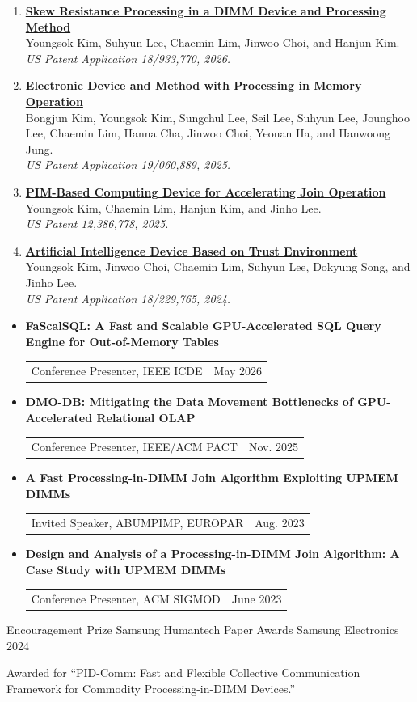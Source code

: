 \documentclass[10pt, a4paper]{awesome-cv}
\makeatletter
\newcommand{\patententry}[4]{%
  \item \textbf{\href{#1}{#2}}\\
  #3\\
  \textit{#4}
}
\newcommand{\talkentry}[3]{%
  \item \textbf{#1}\\[-0.15em]
  \begin{tabular*}{\linewidth}{@{\extracolsep{\fill}}l r}
    #2 & #3
  \end{tabular*}
}
\newenvironment{patentlist}{%
  \vspace{0.4mm}
  \begin{enumerate}[leftmargin=2.2em, label=\arabic*., itemsep=0.4em, topsep=0.2em]
  \small
}{%
  \end{enumerate}
  \vspace{0.4mm}
}
\makeatother
\begin{document}
\begin{patentlist}
  \patententry
    {https://patents.google.com/patent/US20260119044A1/en}
    {Skew Resistance Processing in a DIMM Device and Processing Method}
    {Youngsok Kim, Suhyun Lee, Chaemin Lim, Jinwoo Choi, and Hanjun Kim.}
    {US Patent Application 18/933,770, 2026.}

  \patententry
    {https://patents.google.com/patent/US20250335126A1/en}
    {Electronic Device and Method with Processing in Memory Operation}
    {Bongjun Kim, Youngsok Kim, Sungchul Lee, Seil Lee, Suhyun Lee, Jounghoo Lee, Chaemin Lim, Hanna Cha, Jinwoo Choi, Yeonan Ha, and Hanwoong Jung.}
    {US Patent Application 19/060,889, 2025.}

  \patententry
    {https://patents.google.com/patent/US12386778B2/en}
    {PIM-Based Computing Device for Accelerating Join Operation}
    {Youngsok Kim, Chaemin Lim, Hanjun Kim, and Jinho Lee.}
    {US Patent 12,386,778, 2025.}

  \patententry
    {https://patents.google.com/patent/US20240370563A1/en}
    {Artificial Intelligence Device Based on Trust Environment}
    {Youngsok Kim, Jinwoo Choi, Chaemin Lim, Suhyun Lee, Dokyung Song, and Jinho Lee.}
    {US Patent Application 18/229,765, 2024.}
\end{patentlist}

\begin{itemize}[leftmargin=1.5em, itemsep=0.15em, topsep=0.15em]
  \small
  \talkentry
    {FaScalSQL: A Fast and Scalable GPU-Accelerated SQL Query Engine for Out-of-Memory Tables}
    {Conference Presenter, IEEE ICDE}
    {May 2026}
  \talkentry
    {DMO-DB: Mitigating the Data Movement Bottlenecks of GPU-Accelerated Relational OLAP}
    {Conference Presenter, IEEE/ACM PACT}
    {Nov. 2025}
  \talkentry
    {A Fast Processing-in-DIMM Join Algorithm Exploiting UPMEM DIMMs}
    {Invited Speaker, ABUMPIMP, EUROPAR}
    {Aug. 2023}
  \talkentry
    {Design and Analysis of a Processing-in-DIMM Join Algorithm: A Case Study with UPMEM DIMMs}
    {Conference Presenter, ACM SIGMOD}
    {June 2023}
\end{itemize}

\begin{cventries}
  \cventry
    {Encouragement Prize}
    {Samsung Humantech Paper Awards}
    {Samsung Electronics}
    {2024}
    {\begin{cvitems}
      \item Awarded for ``PID-Comm: Fast and Flexible Collective Communication Framework for Commodity Processing-in-DIMM Devices.''
    \end{cvitems}}
\end{cventries}
\end{document}
